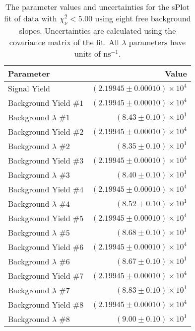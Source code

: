 
\begin{table}[ht]
    \begin{center}
        \begin{tabular}{lr}\toprule
            Parameter & Value \\\midrule
            Signal Yield & $(2.19945 \pm 0.00010) \times 10^{4}$ \\
            Background Yield $\#1$ & $(2.19945 \pm 0.00010) \times 10^{4}$ \\
            Background $\lambda$ $\#1$ & $(8.43 \pm 0.10) \times 10^{1}$ \\
            Background Yield $\#2$ & $(2.19945 \pm 0.00010) \times 10^{4}$ \\
            Background $\lambda$ $\#2$ & $(8.35 \pm 0.10) \times 10^{1}$ \\
            Background Yield $\#3$ & $(2.19945 \pm 0.00010) \times 10^{4}$ \\
            Background $\lambda$ $\#3$ & $(8.40 \pm 0.10) \times 10^{1}$ \\
            Background Yield $\#4$ & $(2.19945 \pm 0.00010) \times 10^{4}$ \\
            Background $\lambda$ $\#4$ & $(8.52 \pm 0.10) \times 10^{1}$ \\
            Background Yield $\#5$ & $(2.19945 \pm 0.00010) \times 10^{4}$ \\
            Background $\lambda$ $\#5$ & $(8.68 \pm 0.10) \times 10^{1}$ \\
            Background Yield $\#6$ & $(2.19945 \pm 0.00010) \times 10^{4}$ \\
            Background $\lambda$ $\#6$ & $(8.67 \pm 0.10) \times 10^{1}$ \\
            Background Yield $\#7$ & $(2.19945 \pm 0.00010) \times 10^{4}$ \\
            Background $\lambda$ $\#7$ & $(8.83 \pm 0.10) \times 10^{1}$ \\
            Background Yield $\#8$ & $(2.19945 \pm 0.00010) \times 10^{4}$ \\
            Background $\lambda$ $\#8$ & $(9.00 \pm 0.10) \times 10^{1}$ \\\bottomrule
        \end{tabular}
        \caption{The parameter values and uncertainties for the sPlot fit of data with $\chi^2_\nu < 5.00$ using eight free background slopes. Uncertainties are calculated using the covariance matrix of the fit. All $\lambda$ parameters have units of $\si{\nano\second}^{-1}$.}\label{tab:splot-fit-results-chisqdof-5.00-free-8}
    \end{center}
\end{table}
